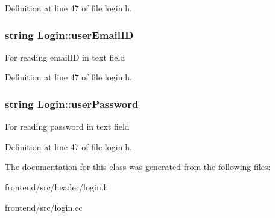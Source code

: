 \-Definition at line 47 of file login.\-h.

\hypertarget{classLogin_aa83b4706e0f0f0afc65f210ee8e4839a}{
\subsubsection[{user\-Email\-I\-D}]{\setlength{\rightskip}{0pt plus 5cm}string {\bf \-Login\-::user\-Email\-I\-D}}}\label{classLogin_aa83b4706e0f0f0afc65f210ee8e4839a}
\-For reading email\-I\-D in text field 

\-Definition at line 47 of file login.\-h.

\hypertarget{classLogin_a9731be126468f535f161f045c95687c6}{
\subsubsection[{user\-Password}]{\setlength{\rightskip}{0pt plus 5cm}string {\bf \-Login\-::user\-Password}}}\label{classLogin_a9731be126468f535f161f045c95687c6}
\-For reading password in text field 

\-Definition at line 47 of file login.\-h.



\-The documentation for this class was generated from the following files\-:\begin{DoxyCompactItemize}
\item 
frontend/src/header/login.\-h\item 
frontend/src/login.\-cc\end{DoxyCompactItemize}
